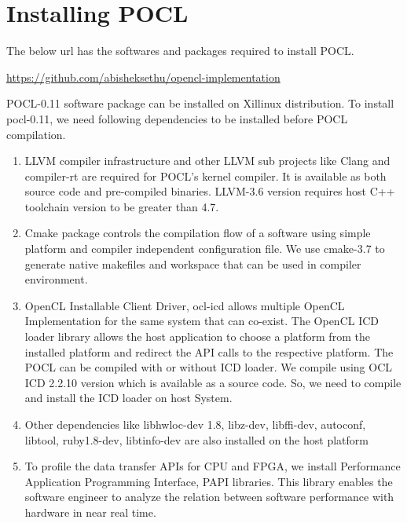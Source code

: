 \section{Installing POCL}
The below url has the softwares and packages required to install POCL.

\url{https://github.com/abisheksethu/opencl-implementation}

POCL-0.11 software package can be installed on Xillinux distribution. To install pocl-0.11, we need following dependencies to be installed before POCL compilation. 
\begin{enumerate}
	\item LLVM compiler infrastructure and other LLVM sub projects like Clang and compiler-rt are required for POCL’s kernel compiler. It is available as both source code and pre-compiled binaries. LLVM-3.6 version requires host C++ toolchain version to be greater than 4.7. 
	\item Cmake package controls the compilation flow of a software using simple platform and compiler independent configuration file. We use cmake-3.7 to generate native makefiles and workspace that can be used in compiler environment. 
	\item OpenCL Installable Client Driver, ocl-icd allows multiple OpenCL Implementation for the same system that can co-exist. The OpenCL ICD loader library allows the host application to choose a platform from the installed platform and redirect the API calls to the respective platform. The POCL can be compiled with or without ICD loader. We compile using OCL ICD 2.2.10 version which is available as a source code. So, we need to compile and install the ICD loader on host System.
	\item Other dependencies like libhwloc-dev 1.8, libz-dev, libffi-dev, autoconf, libtool, ruby1.8-dev, libtinfo-dev are also installed on the host platform
	\item To profile the data transfer APIs for CPU and FPGA, we install Performance Application Programming Interface, PAPI libraries. This library 	enables the software engineer to analyze the relation between software performance with hardware in near real time.
\end{enumerate}

